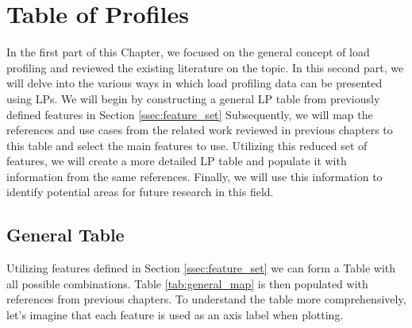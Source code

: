 \section{Table of Profiles}
\label{sec:table_of_profiles}


In the first part of this Chapter, we focused on the general concept of load profiling and reviewed the existing literature on the topic.
In this second part, we will delve into the various ways in which load profiling data can be presented using LPs. 
We will begin by constructing a general LP table from previously defined features in Section \ref{ssec:feature_set}
Subsequently, we will map the references and use cases from the related work reviewed in previous chapters to this table and select the main features to use.
Utilizing this reduced set of features, we will create a more detailed LP table and populate it with information from the same references.
Finally, we will use this information to identify potential areas for future research in this field.



\subsection{General Table}
Utilizing features defined in Section \ref{ssec:feature_set} we can form a Table with all possible combinations.
Table \ref{tab:general_map} is then populated with references from previous chapters.
To understand the table more comprehensively, let's imagine that each feature is used as an axis label when plotting. 


